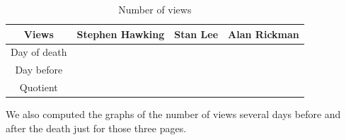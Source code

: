 \documentclass[conference]{IEEEtran}
\begin{document}
\begin{table}[htbp]
\caption{Number of views}
\begin{center}
\begin{tabular}{|c|c|c|c|}
\hline
 Views & \textbf{Stephen Hawking}& \textbf{Stan Lee}& \textbf{Alan Rickman} \\
\hline
Day of death & & &  \\
\hline
Day before & & &  \\
\hline
Quotient & & &  \\
\hline
\end{tabular}
\end{center}
\end{table}

We also computed the graphs of the number of views several days before and after the death just for those three pages. 
\end{document}
